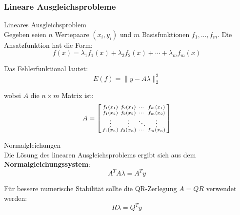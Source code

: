 \subsubsection{Lineare Ausgleichsprobleme}

\begin{definition}{Lineares Ausgleichsproblem}\\
Gegeben seien $n$ Wertepaare $(x_i, y_i)$ und $m$ Basisfunktionen $f_1, ..., f_m$. Die Ansatzfunktion hat die Form:
$$f(x) = \lambda_1 f_1(x) + \lambda_2 f_2(x) + \cdots + \lambda_m f_m(x)$$

Das Fehlerfunktional lautet:
$$E(f) = \|y - A\lambda\|_2^2$$

wobei $A$ die $n \times m$ Matrix ist:
$$A = \begin{bsmallmatrix}
f_1(x_1) & f_2(x_1) & \cdots & f_m(x_1) \\
f_1(x_2) & f_2(x_2) & \cdots & f_m(x_2) \\
\vdots & \vdots & \ddots & \vdots \\
f_1(x_n) & f_2(x_n) & \cdots & f_m(x_n)
\end{bsmallmatrix}$$
\end{definition}

\begin{theorem}{Normalgleichungen}\\
Die Lösung des linearen Ausgleichsproblems ergibt sich aus dem \textbf{Normalgleichungssystem}:
$$A^T A \lambda = A^T y$$

Für bessere numerische Stabilität sollte die QR-Zerlegung $A = QR$ verwendet werden:
$$R\lambda = Q^T y$$
\end{theorem}

